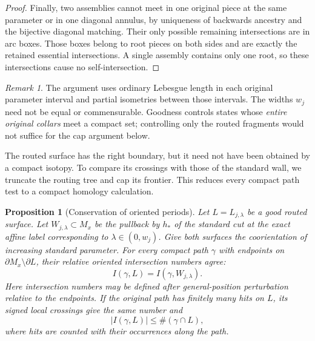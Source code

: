 \documentclass[11pt]{article}
\numberwithin{equation}{section}
\newtheorem{proposition}[theorem]{Proposition}
\theoremstyle{definition}
\theoremstyle{remark}
\newtheorem{remark}[theorem]{Remark}
\begin{document}
\begin{proof}
Finally, two assemblies cannot meet in one original piece at the same
parameter or in one diagonal annulus, by uniqueness of backwards ancestry
and the bijective diagonal matching.  Their only possible remaining
intersections are in arc boxes.  Those boxes belong to root pieces on both
sides and are exactly the retained essential intersections.  A single
assembly contains only one root, so these intersections cause no
self-intersection.
\end{proof}

\begin{remark}
\label{wl:routing-no-width-arithmetic}
The argument uses ordinary Lebesgue length in each original parameter
interval and partial isometries between those intervals.  The widths $w_j$
need not be equal or commensurable.  Goodness controls states whose
\emph{entire original collars} meet a compact set; controlling only the
routed fragments would not suffice for the cap argument below.
\end{remark}

The routed surface has the right boundary, but it need not have been
obtained by a compact isotopy.  To compare its crossings with those of
the standard wall, we truncate the routing tree and cap its frontier.
This reduces every compact path test to a compact homology calculation.

\begin{proposition}[Conservation of oriented periods]
\label{wl:period}
Let $L=L_{j,\lambda}$ be a good routed surface.  Let $W_{j,\lambda}\subset M_x$
be the pullback by $h_*$ of the standard cut at the exact affine label
corresponding to $\lambda\in(0,w_j)$.  Give both surfaces the coorientation of
increasing standard parameter.  For every compact path $\gamma$ with endpoints
on $\partial M_x\setminus\partial L$, their relative oriented intersection
numbers agree:
\begin{equation}
\label{wl:period-identity}
                  I(\gamma,L)=I(\gamma,W_{j,\lambda}).
\end{equation}
Here intersection numbers may be defined after general-position perturbation
relative to the endpoints.  If the original path has finitely many hits on
$L$, its signed local crossings give the same number and
\[
                       |I(\gamma,L)|\leq\#(\gamma\cap L),
\]
where hits are counted with their occurrences along the path.
\end{proposition}
\end{document}
